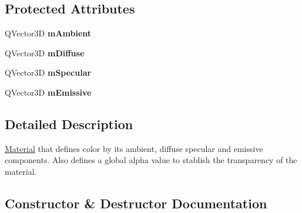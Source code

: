 \subsection*{Protected Attributes}
\begin{DoxyCompactItemize}
\item 
\mbox{\label{class_geometry_engine_1_1_geometry_material_1_1_alpha_color_material_a9957dbc5b4c23e3eff0b10ab1af7e608}} 
Q\+Vector3D {\bfseries m\+Ambient}
\item 
\mbox{\label{class_geometry_engine_1_1_geometry_material_1_1_alpha_color_material_a4981368ae313c85d51e95c5d96a80ba4}} 
Q\+Vector3D {\bfseries m\+Diffuse}
\item 
\mbox{\label{class_geometry_engine_1_1_geometry_material_1_1_alpha_color_material_ad02b0f6108cd0271af8a36283fb98be4}} 
Q\+Vector3D {\bfseries m\+Specular}
\item 
\mbox{\label{class_geometry_engine_1_1_geometry_material_1_1_alpha_color_material_afdd7cf49799cd590f1ec4dad96a75926}} 
Q\+Vector3D {\bfseries m\+Emissive}
\end{DoxyCompactItemize}


\subsection{Detailed Description}
\mbox{\hyperlink{class_geometry_engine_1_1_geometry_material_1_1_material}{Material}} that defines color by its ambient, diffuse specular and emissive components. Also defines a global alpha value to stablish the transparency of the material. 

\subsection{Constructor \& Destructor Documentation}
\mbox{\label{class_geometry_engine_1_1_geometry_material_1_1_alpha_color_material_a6ec6f1a3a9987b1df5fca1a49d30188f}} 
